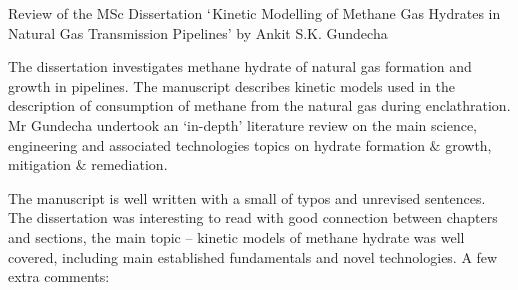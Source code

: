 \documentclass[14pt,twoside]{report}
\begin{document}
\clearpage




\bigskip

\begin{center}
{\Large Review of the MSc Dissertation $\lq$Kinetic Modelling of Methane Gas Hydrates in Natural Gas Transmission Pipelines' by Ankit S.K. Gundecha}
\end{center}

\medskip

The dissertation investigates methane hydrate of natural gas formation and growth in pipelines. The manuscript describes kinetic models used in the description of consumption of methane from the natural gas during enclathration. Mr Gundecha undertook an `in-depth' literature review on the main science, engineering and associated technologies topics on hydrate formation $\&$ growth, mitigation $\&$ remediation.

The manuscript is well written with a small of typos and unrevised sentences. The dissertation was interesting to read with good connection between chapters and sections, the main topic -- kinetic models of methane hydrate was well covered, including main established fundamentals and novel technologies. A few extra comments:
\end{document}
